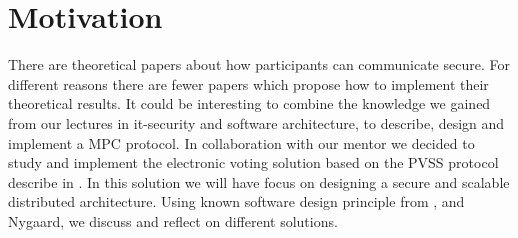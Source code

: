 \section{Motivation} There are theoretical papers about how participants can communicate secure. For different reasons there are fewer papers which propose how to implement their theoretical results. It could be interesting to combine the knowledge we gained from our lectures in it-security and software architecture, to describe, design and implement a MPC protocol. In collaboration with our mentor we decided to study and implement the electronic voting solution based on the PVSS protocol describe in \cite{Schoenmakers1999}. In this solution we will have focus on designing a secure and scalable distributed architecture. Using known software design principle from \cite{Bass}, \cite{Baerbak10} and Nygaard, we discuss and reflect on different solutions.